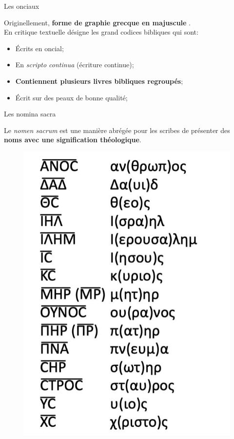 \documentclass[11pt]{beamer}
\begin{document}
\begin{frame}{Les onciaux}

    Originellement, \textbf{forme de graphie grecque \og en majuscule \fg}.\\

    
    \pause
    En critique textuelle désigne les grand codices bibliques qui sont:
    \begin{block}{}
        \begin{itemize}
            \item Écrits en oncial;
            \item En \emph{scripto continua} (écriture continue);
            \item \textbf{Contiennent plusieurs livres bibliques regroupés};
            \item Écrit sur des peaux de bonne qualité;
        \end{itemize}
    \end{block}
\end{frame}


\begin{frame}{Les nomina sacra}
    \begin{alertblock}{}
        Le \emph{nomen sacrum} est une manière abrégée pour les scribes de présenter des \textbf{noms avec une signification théologique}.
    \end{alertblock}
\begin{figure}
    \centering
    \includegraphics[width=0.3\linewidth]{img/nomen_sacrum.png}
\end{figure}
    
\end{frame}
\end{document}
